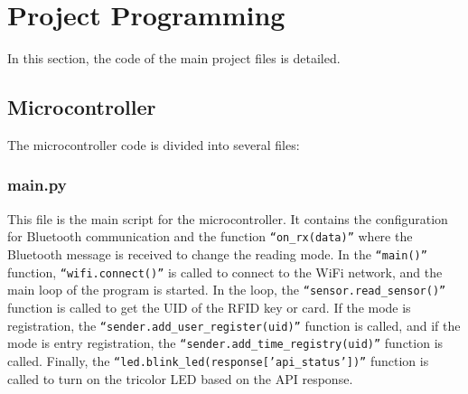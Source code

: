 \documentclass{article}
\begin{document}
\section{Project Programming}
In this section, the code of the main project files is detailed.

\subsection{Microcontroller}
The microcontroller code is divided into several files:

\subsubsection{main.py}
This file is the main script for the microcontroller. It contains the configuration for Bluetooth communication and the function \texttt{``on\_rx(data)''} where the Bluetooth message is received to change the reading mode.
In the \texttt{``main()''} function, \texttt{``wifi.connect()''} is called to connect to the WiFi network, and the main loop of the program is started.
In the loop, the \texttt{``sensor.read\_sensor()''} function is called to get the UID of the RFID key or card.
If the mode is registration, the \texttt{``sender.add\_user\_register(uid)''} function is called, and if the mode is entry registration, the \texttt{``sender.add\_time\_registry(uid)''} function is called.
Finally, the \texttt{``led.blink\_led(response['api\_status'])''} function is called to turn on the tricolor LED based on the API response.
\end{document}
